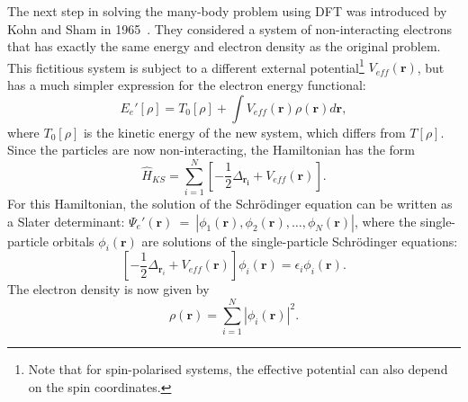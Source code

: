 \begin{refsection}
The next step in solving the many-body problem using DFT was introduced by 
Kohn and Sham in 1965~\cite{Kohn1965}. They considered a system of 
non-interacting electrons that has exactly the same energy and electron 
density as the original problem. This fictitious system is subject to a 
different external potential\footnote{Note that for spin-polarised systems, 
the effective potential can also depend on the spin coordinates.} 
$V_{eff}(\mathbf{r})$, but has a much simpler expression for the electron 
energy functional: 
\begin{equation}\label{dft:eq-nonE} 
E_{e}'[\rho] = T_0[\rho] + \int V_{eff}(\mathbf{r}) \rho(\mathbf{r}) 
d\mathbf{r}, 
\end{equation} 
where $T_0[\rho]$ is the kinetic energy of the new system, which differs from 
$T[\rho]$. Since the particles are now non-interacting, the Hamiltonian has 
the form 
\begin{equation} 
\hat{H}_{KS} = \sum_{i=1}^{N} \left[ - \frac{1}{2} \Delta_{\mathbf{r_i}} + 
V_{eff}(\mathbf{r}) \right]. 
\end{equation} 
For this Hamiltonian, the solution of the Schr\"odinger equation can be 
written as a Slater determinant: $\Psi_e'(\mathbf{r})~=~\left| 
\phi_1(\mathbf{r}),\phi_2(\mathbf{r}), \hdots , \phi_N (\mathbf{r})\right|$, 
where the single-particle orbitals $\phi_i(\mathbf{r})$ are solutions of the 
single-particle Schr\"odinger equations: 
\begin{equation}\label{dft:eq-KS} 
\left[- \frac{1}{2} \Delta_{\mathbf{r}_i} + V_{eff}(\mathbf{r}) \right] \phi_i 
(\mathbf{r}) = \epsilon_i\phi_i (\mathbf{r}). 
\end{equation} 
The electron density is now given by~\cite{Argaman2002} 
\begin{equation}\label{dft:eq-density} 
\rho(\mathbf{r}) = \sum_{i=1}^N \left|\phi_i(\mathbf{r})\right|^2.
\end{equation} 
 

\end{refsection}
